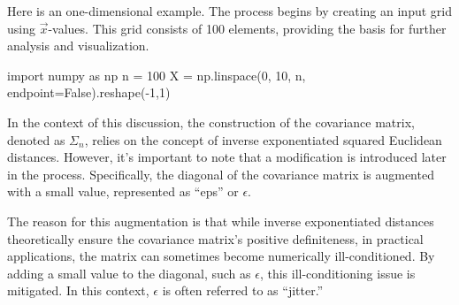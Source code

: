 \documentclass[
  letterpaper,
  DIV=11,
  numbers=noendperiod]{scrreprt}
\newenvironment{Shaded}{\begin{snugshade}}{\end{snugshade}}
\newcommand{\DecValTok}[1]{\textcolor[rgb]{0.68,0.00,0.00}{#1}}
\newcommand{\ImportTok}[1]{\textcolor[rgb]{0.00,0.46,0.62}{#1}}
\newcommand{\NormalTok}[1]{\textcolor[rgb]{0.00,0.23,0.31}{#1}}
\newcommand{\OperatorTok}[1]{\textcolor[rgb]{0.37,0.37,0.37}{#1}}
\newcommand{\VariableTok}[1]{\textcolor[rgb]{0.07,0.07,0.07}{#1}}
\begin{document}
Here is an one-dimensional example. The process begins by creating an
input grid using \(\vec{x}\)-values. This grid consists of 100 elements,
providing the basis for further analysis and visualization.

\begin{Shaded}
\begin{Highlighting}[]
\ImportTok{import}\NormalTok{ numpy }\ImportTok{as}\NormalTok{ np}
\NormalTok{n }\OperatorTok{=} \DecValTok{100}
\NormalTok{X }\OperatorTok{=}\NormalTok{ np.linspace(}\DecValTok{0}\NormalTok{, }\DecValTok{10}\NormalTok{, n, endpoint}\OperatorTok{=}\VariableTok{False}\NormalTok{).reshape(}\OperatorTok{{-}}\DecValTok{1}\NormalTok{,}\DecValTok{1}\NormalTok{)}
\end{Highlighting}
\end{Shaded}

In the context of this discussion, the construction of the covariance
matrix, denoted as \(\Sigma_n\), relies on the concept of inverse
exponentiated squared Euclidean distances. However, it's important to
note that a modification is introduced later in the process.
Specifically, the diagonal of the covariance matrix is augmented with a
small value, represented as ``eps'' or \(\epsilon\).

The reason for this augmentation is that while inverse exponentiated
distances theoretically ensure the covariance matrix's positive
definiteness, in practical applications, the matrix can sometimes become
numerically ill-conditioned. By adding a small value to the diagonal,
such as \(\epsilon\), this ill-conditioning issue is mitigated. In this
context, \(\epsilon\) is often referred to as ``jitter.''
\end{document}
